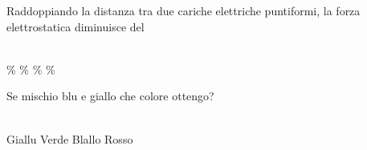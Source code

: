 \documentclass[a4paper,11pt]{exam}
\begin{document}
\begin{questions}
    
\question Raddoppiando la distanza tra due cariche elettriche puntiformi, la forza elettrostatica diminuisce del\\\
\begin{oneparchoices}
  \%
  \%
  \%
  \%
\end{oneparchoices}

    
\question Se mischio blu e giallo che colore ottengo?\\\
\begin{oneparchoices}
  \choice Giallu
  \choice Verde
  \choice Blallo
  \choice Rosso
\end{oneparchoices}

    
\end{questions}

    
    \newpage
    
    
\end{document}
